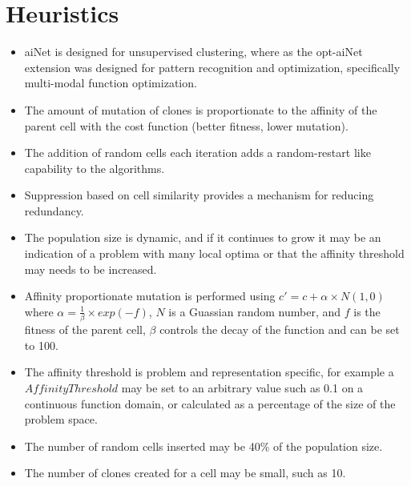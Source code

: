 \documentclass[a4paper, 11pt]{article}
\begin{document}
\section{Heuristics}
\label{sec:heuristics}
\begin{itemize}
	\item aiNet is designed for unsupervised clustering, where as the opt-aiNet extension was designed for pattern recognition and optimization, specifically multi-modal function optimization.
	\item The amount of mutation of clones is proportionate to the affinity of the parent cell with the cost function (better fitness, lower mutation).
	\item The addition of random cells each iteration adds a random-restart like capability to the algorithms.
	\item Suppression based on cell similarity provides a mechanism for reducing redundancy.
	\item The population size is dynamic, and if it continues to grow it may be an indication of a problem with many local optima or that the affinity threshold may needs to be increased.
	\item Affinity proportionate mutation is performed using $c\prime = c + \alpha \times N(1,0)$ where $\alpha = \frac{1}{\beta} \times exp(-f)$, $N$ is a Guassian random number, and $f$ is the fitness of the parent cell, $\beta$ controls the decay of the function and can be set to 100. 
	\item The affinity threshold is problem and representation specific, for example a $AffinityThreshold$ may be set to an arbitrary value such as 0.1 on a continuous function domain, or calculated as a percentage of the size of the problem space.
	\item The number of random cells inserted may be 40\% of the population size. 
	\item The number of clones created for a cell may be small, such as 10.
	
\end{itemize}

\end{document}

